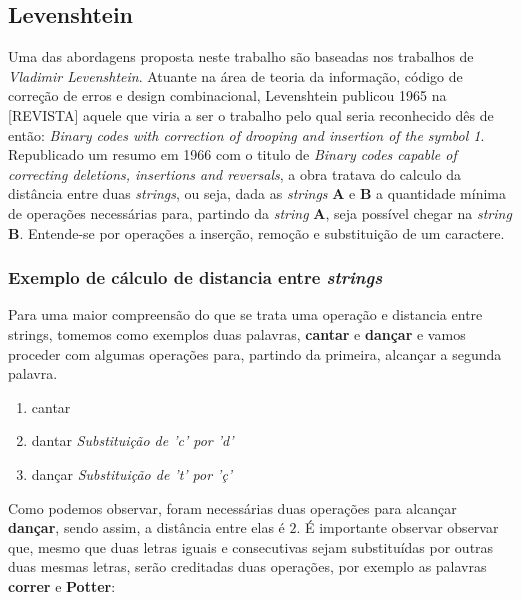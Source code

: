 \subsection{Levenshtein} %
\label{sec:leveinstein}

Uma das abordagens proposta neste trabalho são baseadas nos trabalhos de \textit{Vladimir Levenshtein}. Atuante na área de teoria da informação, código de correção de erros e design combinacional, Levenshtein publicou 1965 na [REVISTA] aquele que viria a ser o trabalho pelo qual seria reconhecido dês de então: \textit{Binary codes with correction of drooping and insertion of the symbol 1}\cite{levenshtein1965}. Republicado um resumo em 1966 com o titulo de \textit{Binary codes capable of correcting deletions, insertions and reversals}\cite{levenshtein1966}, a obra tratava do calculo da distância entre duas \textit{strings}, ou seja, dada as \textit{strings} \textbf{A} e \textbf{B} a quantidade mínima de operações necessárias para, partindo da \textit{string} \textbf{A}, seja possível chegar na \textit{string} \textbf{B}. Entende-se por operações a inserção, remoção e substituição de um caractere.

\subsubsection{Exemplo de cálculo de distancia entre \textit{strings}} %
\label{sub:exemplo_de_c_lculo_de_distancia_entre_it}

Para uma maior compreensão do que se trata uma operação e distancia entre strings, tomemos como exemplos duas palavras, \textbf{cantar} e \textbf{dançar} e vamos proceder com algumas operações para, partindo da primeira, alcançar a segunda palavra.


\begin{enumerate}[start=0]
	\item cantar
	\item dantar \textit{Substituição de 'c' por 'd'}
	\item dançar \textit{Substituição de 't' por 'ç'}
\end{enumerate}

Como podemos observar, foram necessárias duas operações para alcançar \textbf{dançar}, sendo assim, a distância entre elas é $2$.
É importante observar observar que, mesmo que duas letras iguais e consecutivas sejam substituídas por outras duas mesmas letras, serão creditadas duas operações, por exemplo as palavras \textbf{correr} e \textbf{Potter}:

